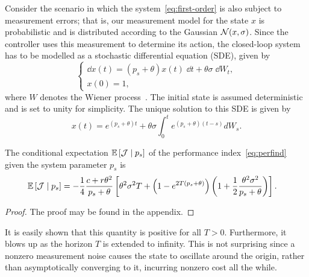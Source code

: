 Consider the scenario in which the system~\eqref{eq:first-order} is also subject
to measurement errors; that is, our measurement model for the state $x$ is
probabilistic and is distributed according to the Gaussian $\mathcal{N}(x,
\sigma)$. Since the controller uses this measurement to determine its action,
the closed-loop system has to be modelled as a stochastic differential equation
(SDE), given by
%
\begin{equation} 
  \begin{cases} 
    \dd x(t) = (p_s+\theta)x(t) \; \dd t + \theta\sigma \; \dd W_t, \\ x(0) = 1,
  \end{cases} 
  \label{eq:first-order-SDE}
\end{equation}
%
where $W$ denotes the Wiener process~\cite{evans2012introduction}. The initial
state is assumed deterministic and is set to unity for simplicity.  
% 
The unique solution to this SDE is given by
%
\begin{equation}
    x(t) = e^{(p_s+\theta)t} + \theta\sigma \int_0^t e^{(p_s+\theta)(t-s)}dW_s.
    \label{eq:sol-sde}
\end{equation}
%
\vspace{-4mm}
\begin{lem}\label{lem:1}
    The conditional expectation $\mathbb{E}\left[\mathcal{J}\mid p_s\right]$ of the
    performance index~\eqref{eq:perfind} given the system parameter $p_s$ is 
    \begin{align*} 
      \mathbb{E}\left[\mathcal{J} \mid p_s\right] &=-\frac{1}{4}\frac{c+r\theta^2}{p_s+\theta}
       \left[ \theta^2 \sigma^2 T + \left(1 - e^{2T(p_s+\theta)}\right) \left(1 +
      \frac{1}{2}\frac{\theta^2\sigma^2}{p_s+\theta}\right)\right].  
    \end{align*} 
\end{lem}
%

\begin{proof}
    The proof may be found in the appendix.
\end{proof}
%

%
It is easily shown that this quantity is positive for all $T>0$. Furthermore, it
blows up as the horizon $T$ is extended to infinity. This is not surprising
since a nonzero measurement noise causes the state to oscillate around the
origin, rather than asymptotically converging to it, incurring nonzero cost
all the while.

